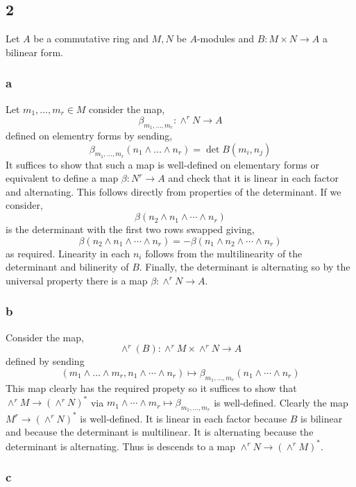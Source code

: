 \documentclass[12pt]{article}
\begin{document}
\subsection{2}

Let $A$ be a commutative ring and $M, N$ be $A$-modules and $B : M \times N \to A$ a bilinear form.

\subsubsection{a}

Let $m_1, \dots, m_r \in M$ consider the map,
\[ \beta_{m_1, \dots, m_r} : \wedge^r N \to A \]
defined on elementry forms by sending,
\[ \beta_{m_1, \dots, m_r}(n_1 \wedge \dots \wedge n_r) = \det{B(m_i, n_j)} \]
It suffices to show that such a map is well-defined on elementary forms or equivalent to define a map $\beta : N^r \to A$ and check that it is linear in each factor and alternating. This follows directly from properties of the determinant. If we consider,
\[ \beta(n_2 \wedge n_1 \wedge \cdots \wedge n_r) \]
is the determinant with the first two rows swapped giving,
\[ \beta(n_2 \wedge n_1 \wedge \cdots \wedge n_r) = - \beta(n_1 \wedge n_2 \wedge \cdots \wedge n_r) \]
as required. Linearity in each $n_i$ follows from the multilinearity of the determinant and bilinerity of $B$. Finally, the determinant is alternating so by the universal property there is a map $\beta : \wedge^r N \to A$.

\subsubsection{b}

Consider the map,
\[ \wedge^r(B) : \wedge^r M \times \wedge^r N \to A \]
defined by sending 
\[ (m_1 \wedge \dots \wedge m_r, n_1 \wedge \cdots \wedge n_r) \mapsto \beta_{m_1, \dots, m_r}(n_1 \wedge \cdots \wedge n_r) \]
This map clearly has the required propety so it suffices to show that $\wedge^r M \to (\wedge^r N)^*$ via $m_1 \wedge \cdots \wedge m_r \mapsto \beta_{m_1, \dots, m_r}$ is well-defined. Clearly the map $M^r \to (\wedge^r N)^*$ is well-defined. It is linear in each factor because $B$ is bilinear and because the determinant is multilinear. It is alternating because the determinant is alternating. Thus is descends to a map $\wedge^r N \to (\wedge^r M)^*$.

\subsubsection{c}
\end{document}
